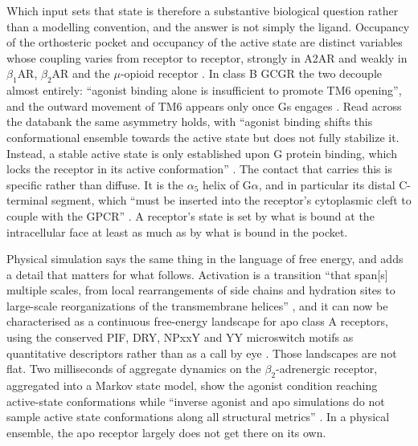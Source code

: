 Which input sets that state is therefore a substantive biological question rather than a modelling
convention, and the answer is not simply the ligand. Occupancy of the orthosteric pocket and
occupancy of the active state are distinct variables whose coupling varies from receptor to
receptor, strongly in A2AR and weakly in $\beta_1$AR, $\beta_2$AR and the $\mu$-opioid receptor
\citep[p.~3698]{georgiou2025heterogeneity}. In class B GCGR the two decouple almost entirely: ``agonist binding
alone is insufficient to promote TM6 opening'', and the outward movement of TM6 appears only once
Gs engages \citep[p.~1]{hilger2020gcgr}. Read across the databank the same asymmetry holds, with ``agonist
binding shifts this conformational ensemble towards the active state but does not fully stabilize
it. Instead, a stable active state is only established upon G protein binding, which locks the
receptor in its active conformation'' \citep[p.~1]{paajanen2026activation}. The contact that carries this is
specific rather than diffuse. It is the $\alpha_5$ helix of G$\alpha$, and in particular its distal
C-terminal segment, which ``must be inserted into the receptor's cytoplasmic cleft to couple with
the GPCR'' \citep[p.~3694]{georgiou2025heterogeneity}. A receptor's state is set by what is bound at the
intracellular face at least as much as by what is bound in the pocket.

Physical simulation says the same thing in the language of free energy, and adds a detail that
matters for what follows. Activation is a transition ``that span[s] multiple scales, from local
rearrangements of side chains and hydration sites to large-scale reorganizations of the
transmembrane helices'' \citep[Introduction]{aureli2026epath}, and it can now be characterised as a
continuous free-energy landscape for apo class A receptors, using the conserved PIF, DRY, NPxxY and
YY microswitch motifs as quantitative descriptors rather than as a call by eye
\citep[Methods]{aureli2026epath}. Those landscapes are not flat. Two milliseconds of aggregate dynamics
on the $\beta_2$-adrenergic receptor, aggregated into a Markov state model, show the agonist condition
reaching active-state conformations while ``inverse agonist and apo simulations do not sample active
state conformations along all structural metrics'' \citep[Results]{kohlhoff2014gpcr}. In a physical
ensemble, the apo receptor largely does not get there on its own.

